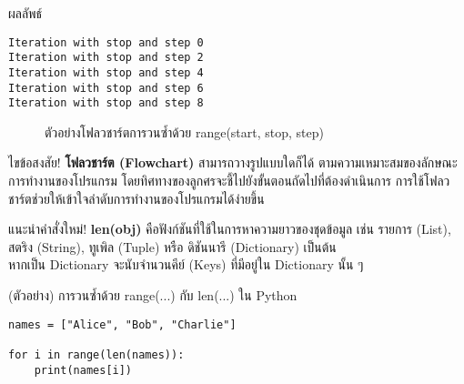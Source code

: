 \documentclass[12pt,a4paper]{article}
\newcommand{\textlight}[1]{{\thailightfont #1}}
\begin{document}
\begin{resultbox}{ผลลัพธ์}
\begin{verbatim}
Iteration with stop and step 0
Iteration with stop and step 2
Iteration with stop and step 4
Iteration with stop and step 6
Iteration with stop and step 8
\end{verbatim}
\end{resultbox}

\begin{figure}[H]
\centering
{}
\caption{ตัวอย่างโฟลวชาร์ตการวนซ้ำด้วย range(start, stop, step)}
\end{figure}

\begin{answerbox}{ไขข้อสงสัย!}
\textlight{\textbf{โฟลวชาร์ต (Flowchart)} สามารถวางรูปแบบใดก็ได้ ตามความเหมาะสมของลักษณะการทำงานของโปรแกรม โดยทิศทางของลูกศรจะชี้ไปยังขั้นตอนถัดไปที่ต้องดำเนินการ การใช้โฟลวชาร์ตช่วยให้เข้าใจลำดับการทำงานของโปรแกรมได้ง่ายขึ้น}
\end{answerbox}

\begin{noticebox}{แนะนำคำสั่งใหม่!}
\textlight{\textbf{len(obj)} คือฟังก์ชันที่ใช้ในการหาความยาวของชุดข้อมูล เช่น รายการ (List), สตริง (String), ทูเพิล (Tuple) หรือ ดิชันนารี (Dictionary) เป็นต้น \\[0.2cm] หากเป็น Dictionary จะนับจำนวนคีย์ (Keys) ที่มีอยู่ใน Dictionary นั้น ๆ}
\end{noticebox}

\begin{codebox}{(ตัวอย่าง) การวนซ้ำด้วย range(...) กับ len(...) ใน Python}
\begin{lstlisting}[style=python]
names = ["Alice", "Bob", "Charlie"]

for i in range(len(names)):
    print(names[i])
\end{lstlisting}
\end{codebox}
\end{document}
